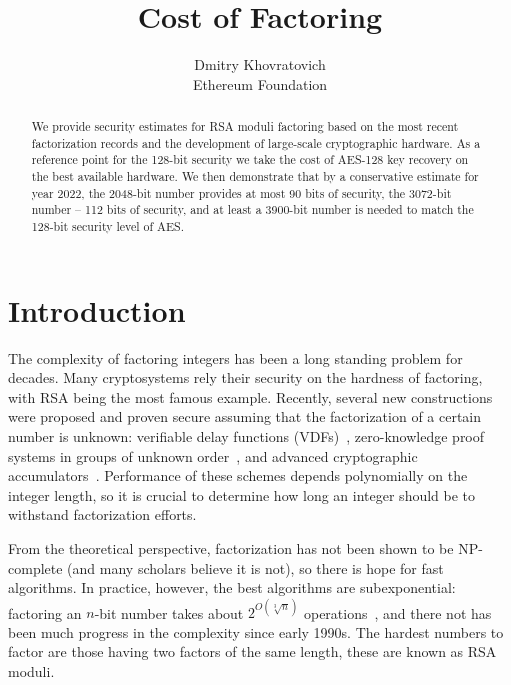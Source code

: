 \documentclass[a4paper]{article}
\title{Cost of Factoring}
\author{Dmitry Khovratovich\\Ethereum Foundation}
\begin{document}
\maketitle

\begin{abstract}
    We provide security estimates for RSA moduli factoring based on the most recent factorization records and the development of large-scale cryptographic hardware. As a reference point for the 128-bit security we take the cost of AES-128 key recovery on the best available hardware. We then demonstrate that by a conservative estimate for year 2022, the 2048-bit number provides at most 90 bits of security, the 3072-bit number -- 112 bits of security, and at least a 3900-bit number is needed to match the 128-bit security level of AES. 
\end{abstract}

\section{Introduction}

The complexity of factoring integers has been a long standing problem for decades. Many cryptosystems rely their security on the hardness of factoring, with RSA being the most famous example. Recently, several new constructions were  proposed and proven  secure assuming that the factorization of a certain number is unknown: verifiable delay functions (VDFs)~\cite{DBLP:conf/eurocrypt/Wesolowski19,DBLP:conf/crypto/BonehBBF18}, zero-knowledge proof systems in groups of unknown order~\cite{cryptoeprint:2019:1229}, and advanced cryptographic accumulators~\cite{cryptoeprint:2019:1494}. Performance of these schemes depends polynomially on the integer length, so it is crucial to determine how long an integer should be to withstand factorization efforts.

From the theoretical perspective, factorization has not been shown to be NP-complete (and many scholars believe it is not), so there is hope for fast algorithms. In practice, however, the best algorithms are subexponential: factoring an $n$-bit number takes about $2^{O(\sqrt[3]{n})}$ operations~\cite{lenstra1993development}, and there not has been much progress in the complexity since early 1990s. The hardest numbers to factor are those having two factors of the same length, these are known as RSA moduli.
\end{document}
